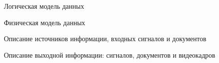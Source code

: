 \documentclass{beamer}
\begin{document}
\begin{frame}
	{Логическая модель данных}
\end{frame}

\begin{frame}
	{Физическая модель данных}
\end{frame}

\begin{frame}
	{Описание источников информации, входных сигналов и документов}
\end{frame}

\begin{frame}
	{Описание выходной информации: сигналов, документов и видеокадров}
\end{frame}
\end{document}
